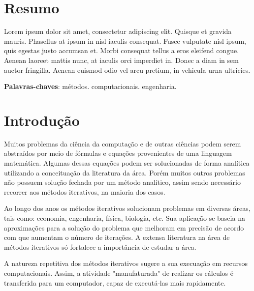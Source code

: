\documentclass[a4paper, 12pt, openright, oneside]{article}
\begin{document}
\newpage
\newpage
\tableofcontents
\thispagestyle{empty}

\newpage
{}
\section*{Resumo}

Lorem ipsum dolor sit amet, consectetur adipiscing elit. Quisque et gravida mauris. Phasellus at ipsum in nisl iaculis consequat. Fusce vulputate nisl ipsum, quis egestas justo accumsan et. Morbi consequat tellus a eros eleifend congue. Aenean laoreet mattis nunc, at iaculis orci imperdiet in. Donec a diam in sem auctor fringilla. Aenean euismod odio vel arcu pretium, in vehicula urna ultricies. 

 \noindent
 \textbf{Palavras-chaves}: métodos. computacionais. engenharia.
\newpage



\section{Introdução}

\pagestyle{myheadings}
\markright{ }

Muitos problemas da ciência da computação e de outras ciências podem serem abstraídos por meio de fórmulas e equações provenientes de uma linguagem matemática. Algumas dessas equações podem ser solucionadas de forma analítica utilizando a conceituação da literatura da área. Porém muitos outros problemas não possuem solução fechada por um método analítico, assim sendo necessário recorrer aos métodos iterativos, na maioria dos casos.

Ao longo dos anos os métodos iterativos solucionam problemas em diversas áreas, tais como: economia, engenharia, física, biologia, etc. Sua aplicação se baseia na aproximações para a solução do problema que melhoram em precisão de acordo com que aumentam o número de iterações. A extensa literatura na área de métodos iterativos só fortalece a importância de estudar a área.

A natureza repetitiva dos métodos iterativos sugere a sua execuação em recursos computacionais. Assim, a atividade "manufaturada" de realizar os cálculos é transferida para um computador, capaz de executá-las mais rapidamente.
\end{document}
